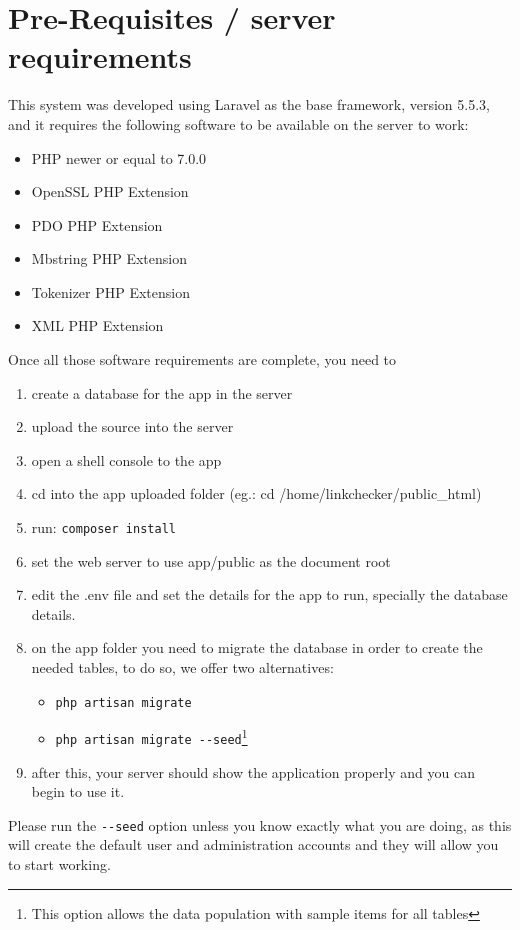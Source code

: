 \section{Pre-Requisites / server requirements}
This system was developed using Laravel as the base framework, version 5.5.3, and it requires the following software to be available on the server to work:

\begin{itemize}
	\item PHP newer or equal to 7.0.0
	\item OpenSSL PHP Extension
	\item PDO PHP Extension
	\item Mbstring PHP Extension
	\item Tokenizer PHP Extension
	\item XML PHP Extension
\end{itemize}

Once all those software requirements are complete, you need to 

\begin{enumerate}
	\item create a database for the app in the server
	\item upload the source into the server
	\item open a shell console to the app
	\item cd into the app uploaded folder (eg.: cd /home/linkchecker/public\_html)
	\item run: \verb|composer install|
	\item set the web server to use app/public as the document root 
	\item edit the .env file and set the details for the app to run, specially the database details.
	\item on the app folder you need to migrate the database in order to create the needed tables, to do so, we offer two alternatives:
	\begin{itemize}
		\item \verb|php artisan migrate| 
		\item \verb|php artisan migrate --seed|\footnote{This option allows the data population with sample items for all tables}
	\end{itemize}
	\item after this, your server should show the application properly and you can begin to use it.
\end{enumerate}

Please run the \verb|--seed| option unless you know exactly what you are doing, as this will create the default user and administration accounts and they will allow you to start working.


